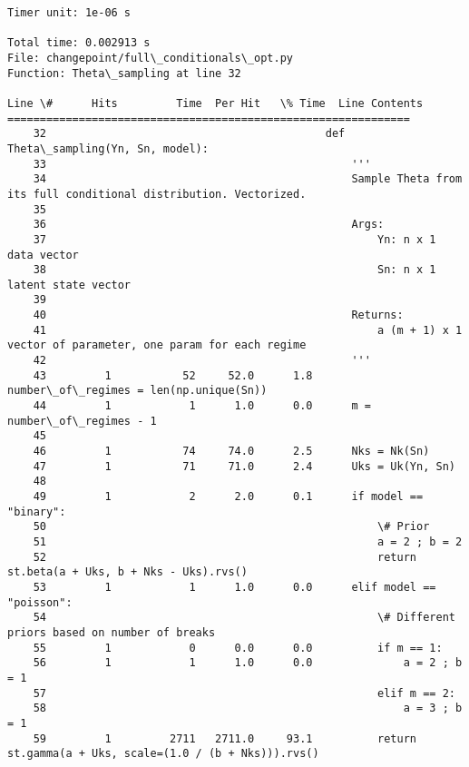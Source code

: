 \documentclass{article}
\begin{document}
    \begin{Verbatim}[commandchars=\\\{\}]
Timer unit: 1e-06 s

Total time: 0.002913 s
File: changepoint/full\_conditionals\_opt.py
Function: Theta\_sampling at line 32

Line \#      Hits         Time  Per Hit   \% Time  Line Contents
==============================================================
    32                                           def Theta\_sampling(Yn, Sn, model):
    33                                               '''
    34                                               Sample Theta from its full conditional distribution. Vectorized.
    35                                           
    36                                               Args:
    37                                                   Yn: n x 1 data vector
    38                                                   Sn: n x 1 latent state vector
    39                                               
    40                                               Returns:
    41                                                   a (m + 1) x 1 vector of parameter, one param for each regime
    42                                               '''
    43         1           52     52.0      1.8      number\_of\_regimes = len(np.unique(Sn))
    44         1            1      1.0      0.0      m = number\_of\_regimes - 1
    45                                           
    46         1           74     74.0      2.5      Nks = Nk(Sn)
    47         1           71     71.0      2.4      Uks = Uk(Yn, Sn)
    48                                           
    49         1            2      2.0      0.1      if model == "binary":
    50                                                   \# Prior
    51                                                   a = 2 ; b = 2
    52                                                   return st.beta(a + Uks, b + Nks - Uks).rvs()
    53         1            1      1.0      0.0      elif model == "poisson":
    54                                                   \# Different priors based on number of breaks
    55         1            0      0.0      0.0          if m == 1:
    56         1            1      1.0      0.0              a = 2 ; b = 1
    57                                                   elif m == 2:
    58                                                       a = 3 ; b = 1
    59         1         2711   2711.0     93.1          return st.gamma(a + Uks, scale=(1.0 / (b + Nks))).rvs()
    \end{Verbatim}
\end{document}
